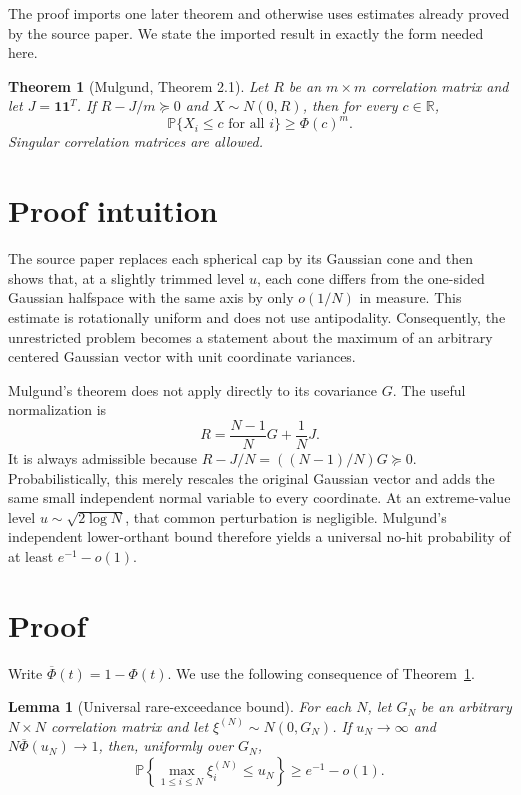 \documentclass[11pt]{article}
\newtheorem{theorem}{Theorem}
\newtheorem{lemma}{Lemma}
\newcommand{\R}{\mathbb R}
\newcommand{\PP}{\mathbb P}
\newcommand{\phibar}{\overline\Phi}
\begin{document}
The proof imports one later theorem and otherwise uses estimates already
proved by the source paper.  We state the imported result in exactly the form
needed here.

\begin{theorem}[Mulgund, Theorem 2.1]\label{thm:mulgund}
Let $R$ be an $m\times m$ correlation matrix and let $J=\mathbf1\mathbf1^T$.
If $R-J/m\succeq0$ and $X\sim N(0,R)$, then for every $c\in\R$,
\[
 \PP\{X_i\le c\text{ for all }i\}\ge \Phi(c)^m.
\]
Singular correlation matrices are allowed.
\end{theorem}

\section{Proof intuition}

The source paper replaces each spherical cap by its Gaussian cone and then
shows that, at a slightly trimmed level $u$, each cone differs from the
one-sided Gaussian halfspace with the same axis by only $o(1/N)$ in measure.
This estimate is rotationally uniform and does not use antipodality.
Consequently, the unrestricted problem becomes a statement about the maximum
of an arbitrary centered Gaussian vector with unit coordinate variances.

Mulgund's theorem does not apply directly to its covariance $G$.  The useful
normalization is
\[
 R=\frac{N-1}{N}G+\frac1N J.
\]
It is always admissible because $R-J/N=((N-1)/N)G\succeq0$.  Probabilistically,
this merely rescales the original Gaussian vector and adds the same small
independent normal variable to every coordinate.  At an extreme-value level
$u\sim\sqrt{2\log N}$, that common perturbation is negligible.  Mulgund's
independent lower-orthant bound therefore yields a universal no-hit
probability of at least $e^{-1}-o(1)$.

\section{Proof}

Write $\phibar(t)=1-\Phi(t)$.  We use the following consequence of
Theorem~\ref{thm:mulgund}.

\begin{lemma}[Universal rare-exceedance bound]\label{lem:gaussian}
For each $N$, let $G_N$ be an arbitrary $N\times N$ correlation matrix and
let $\xi^{(N)}\sim N(0,G_N)$.  If $u_N\to\infty$ and
$N\phibar(u_N)\to1$, then, uniformly over $G_N$,
\[
 \PP\!\left\{\max_{1\le i\le N}\xi_i^{(N)}\le u_N\right\}
 \ge e^{-1}-o(1).
\]
\end{lemma}
\end{document}
